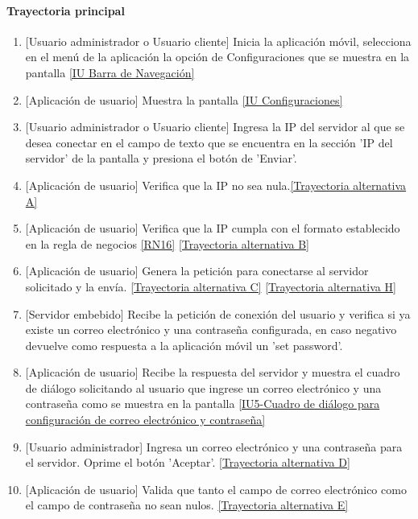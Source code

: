 \paragraph{Trayectoria principal} \label{SUB-U-CU1.4:TP}
	\begin{enumerate}
		\item {[Usuario administrador o Usuario cliente]} Inicia la aplicación móvil, selecciona en el menú de la aplicación la opción de Configuraciones que se muestra en la pantalla \hyperref[fig:Barra de navegacion]{[IU Barra de Navegación]}
		\item {[Aplicación de usuario]} Muestra la pantalla \hyperref[fig:Configuraciones]{[IU Configuraciones]}
		\item {[Usuario administrador o Usuario cliente]} Ingresa la IP del servidor al que se desea conectar en el campo de texto que se encuentra en la sección 'IP del servidor' de la pantalla y presiona el botón de 'Enviar'.
		\item {[Aplicación de usuario]} Verifica que la IP no sea nula.\hyperref[SUB-U-CU1.4:TA]{[Trayectoria alternativa A]}
		\item {[Aplicación de usuario]} Verifica que la IP cumpla con el formato establecido en la regla de negocios \ref{RN16} \hyperref[SUB-U-CU1.4:TB]{[Trayectoria alternativa B]}
		\item {[Aplicación de usuario]} Genera la petición para conectarse al servidor solicitado y la envía. \hyperref[SUB-U-CU1.4:TC]{[Trayectoria alternativa C]} \hyperref[SUB-U-CU1.4:TH]{[Trayectoria alternativa H]}
		\item {[Servidor embebido]} Recibe la petición de conexión del usuario y verifica si ya existe un correo electrónico y una contraseña configurada, en caso negativo devuelve como respuesta a la aplicación móvil un 'set password'.
		\item {[Aplicación de usuario]} Recibe la respuesta del servidor y muestra el cuadro de diálogo solicitando al usuario que ingrese un correo electrónico y una contraseña como se muestra en la pantalla \hyperref[fig:Set password]{[IU5-Cuadro de diálogo para configuración de correo electrónico y contraseña]}
		\item {[Usuario administrador]} Ingresa un correo electrónico y una contraseña para el servidor. Oprime el botón 'Aceptar'. \hyperref[SUB-U-CU1.4:TD]{[Trayectoria alternativa D]}
		\item {[Aplicación de usuario]} Valida que tanto el campo de correo electrónico como el campo de contraseña no sean nulos. \hyperref[SUB-U-CU1.4:TE]{[Trayectoria alternativa E]}

\end{enumerate}
